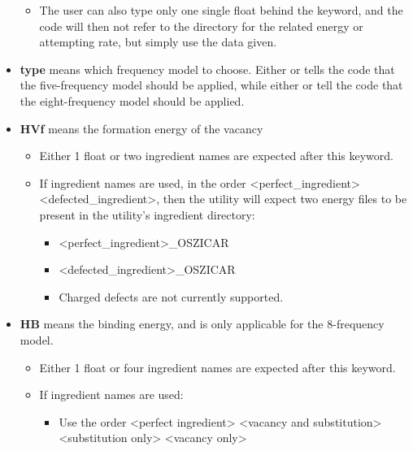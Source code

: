 \documentclass[letterpaper,10pt,english]{sphinxmanual}
\begin{document}
\begin{itemize}
\begin{itemize}
\begin{itemize}
\begin{itemize}
\end{itemize}

\end{itemize}

\item {} 
The user can also type only one single float behind the keyword, and the code will then not refer to the directory for the related energy or attempting rate, but simply use the data given.

\end{itemize}

\item {} 
\textbf{type} means which frequency model to choose. Either  or  tells the code that the five-frequency model should be applied, while either  or  tell the code that the eight-frequency model should be applied.

\item {} 
\textbf{HVf} means the formation energy of the vacancy
\begin{itemize}
\item {} 
Either 1 float or two ingredient names are expected after this keyword.

\item {} 
If ingredient names are used, in the order \textless{}perfect\_ingredient\textgreater{} \textless{}defected\_ingredient\textgreater{}, then the utility will expect two energy files to be present in the utility's ingredient directory:
\begin{itemize}
\item {} 
\textless{}perfect\_ingredient\textgreater{}\_OSZICAR

\item {} 
\textless{}defected\_ingredient\textgreater{}\_OSZICAR

\item {} 
Charged defects are not currently supported.

\end{itemize}

\end{itemize}

\item {} 
\textbf{HB} means the binding energy, and is only applicable for the 8-frequency model.
\begin{itemize}
\item {} 
Either 1 float or four ingredient names are expected after this keyword.

\item {} 
If ingredient names are used:
\begin{itemize}
\item {} 
Use the order \textless{}perfect ingredient\textgreater{} \textless{}vacancy and substitution\textgreater{} \textless{}substitution only\textgreater{} \textless{}vacancy only\textgreater{}


\end{itemize}
\end{itemize}
\end{itemize}
\end{document}
